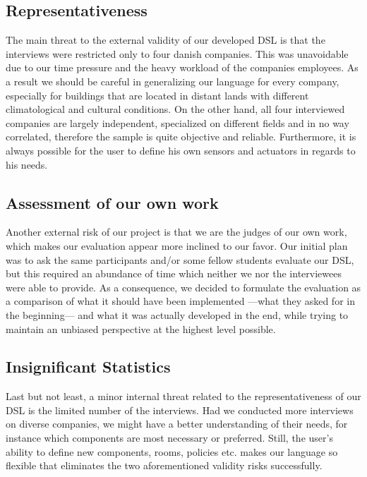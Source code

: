 \subsection{Representativeness}

The main threat to the external validity of our developed DSL is that the interviews were restricted only to four danish companies. This was unavoidable due to our time pressure and the heavy workload of the companies employees. As a result we should be careful in generalizing our language for every company, especially for buildings that are located in distant lands with different climatological and cultural conditions. On the other hand, all four interviewed companies are largely independent, specialized on different fields and in no way correlated, therefore the sample is quite objective and reliable. Furthermore, it is always possible for the user to define his own sensors and actuators in regards to his needs.

\subsection{Assessment of our own work}

Another external risk of our project is that we are the judges of our own work, which makes our evaluation appear more inclined to our favor. Our initial plan was to ask the same participants and/or some fellow students evaluate our DSL, but this required an abundance of time which neither we nor the interviewees were able to provide. As a consequence, we decided to formulate the evaluation as a comparison of what it should have been implemented ---what they asked for in the beginning--- and what it was actually developed in the end, while trying to maintain an unbiased perspective at the highest level possible.

\subsection{Insignificant Statistics}

Last but not least, a minor internal threat related to the representativeness of our DSL is the limited number of the interviews. Had we conducted more interviews on diverse companies, we might have a better understanding of their needs, for instance which components are most necessary or preferred. Still, the user's ability to define new components, rooms, policies etc. makes our language so flexible that eliminates the two aforementioned validity risks successfully.